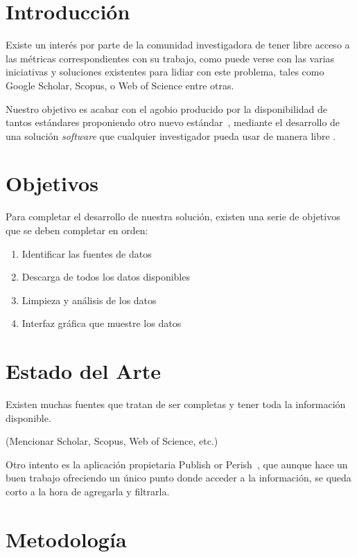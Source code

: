 \chapter{Introducción}

Existe un interés por parte de la comunidad investigadora de tener libre acceso a las métricas correspondientes con su trabajo, como puede verse con las varias iniciativas y soluciones existentes para lidiar con este problema, tales como Google Scholar, Scopus, o Web of Science entre otras.

Nuestro objetivo es acabar con el agobio producido por la disponibilidad de tantos estándares proponiendo otro nuevo estándar~\cite{xkcd_standards}, mediante el desarrollo de una solución \emph{software} que cualquier investigador pueda usar de manera libre .

\chapter{Objetivos}

Para completar el desarrollo de nuestra solución, existen una serie de objetivos que se deben completar en orden:

\begin{enumerate}
  \item Identificar las fuentes de datos
  \item Descarga de todos los datos disponibles
  \item Limpieza y análisis de los datos
  \item Interfaz gráfica que muestre los datos
\end{enumerate}

\chapter{Estado del Arte}

Existen muchas fuentes que tratan de ser completas y tener toda la información disponible.

(Mencionar Scholar, Scopus, Web of Science, etc.)

Otro intento es la aplicación propietaria Publish or Perish~\cite{publish_or_perish}, que aunque hace un buen trabajo ofreciendo un único punto donde acceder a la información, se queda corto a la hora de agregarla y filtrarla.

\chapter{Metodología}

